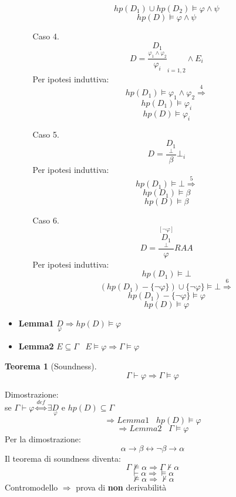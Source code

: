 \documentclass{article}
\newtheorem{theorem}{Teorema}
\theoremstyle{break}
\theoremstyle{break}
\theoremstyle{break}
\theoremstyle{break}
\begin{document}
\begin{enumerate}
\begin{enumerate}
\[        \] 
        \[
          hp(D_1) \cup hp(D_2) \models \varphi \wedge \psi
        \] 
        \[
          hp(D) \models \varphi \wedge \psi
        \] 
      \item [Caso 4.] 
        \[
          D=\frac{\underset{\varphi_1 \wedge \varphi_2}{D_1}}{\varphi_i}_{i=1,2} \wedge E_i
        \] 
        Per ipotesi induttiva:
        \[
          hp(D_1) \models \varphi_1 \wedge \varphi_2 \stackrel{4}{\Rightarrow}
        \]  
        \[
          hp(D_1) \models \varphi_i
        \] 
        \[
          hp(D) \models \varphi_i
        \] 
      \item [Caso 5.]
        \[
          D=\frac{\underset{\bot}{D_1}}{\beta}\bot_i
        \] 
        Per ipotesi induttiva:
        \[
          hp(D_1) \models \bot \stackrel{5}{\Rightarrow}
        \] 
        \[
          hp(D_1) \models \beta
        \] 
        \[
          hp(D) \models \beta
        \] 
      \item [Caso 6.]
        \[
          D= \frac{\underset{\bot}{\stackrel{[\neg \varphi]}{D_1}}}{\varphi} RAA
        \] 
        Per ipotesi induttiva:
        \[
          hp(D_1) \models \bot
        \] 
        \[
          (hp(D_1)-\{\neg \varphi\}) \cup \{\neg \varphi\} \models \bot \stackrel{6}{\Rightarrow}
        \] 
        \[
          hp(D_1) - \{\neg \varphi\} \models \varphi 
        \] 
        \[
          hp(D) \models \varphi
        \] 
    \end{enumerate}
\end{enumerate}

\begin{itemize}
  \item \textbf{Lemma1} \( \underset{\varphi}{D} \Rightarrow hp(D) \models \varphi \)
  \item \textbf{Lemma2} \( E \subseteq \Gamma\;\;\; E \models \varphi \Rightarrow \Gamma \models \varphi \)
\end{itemize}

\begin{theorem} [Soundness]
  \[
    \Gamma \vdash \varphi \Rightarrow \Gamma \models \varphi
  \] 
\end{theorem}
Dimostrazione:\\
se \( \Gamma \vdash \varphi \stackrel{def}{\Leftrightarrow} \exists \underset{\varphi}{D} \) e \( hp(D) \subseteq \Gamma \)  
\[
  \Rightarrow Lemma1\;\;\; hp(D) \models \varphi
\] 
\[
  \Rightarrow Lemma2\;\;\; \Gamma \models \varphi
\] 
Per la dimostrazione:
\[
  \alpha \to \beta \leftrightarrow \neg \beta \to \alpha
\] 
Il teorema di soundness diventa:
\[
  \Gamma \not\models \alpha \Rightarrow \Gamma \not\vdash \alpha
\]
\[
  \vdash \alpha \Rightarrow \models \alpha
\] 
\[
  \not\models \alpha \Rightarrow \not\vdash \alpha
\] 
Contromodello \( \Rightarrow \) prova di \textbf{non} derivabilità
\end{document}
